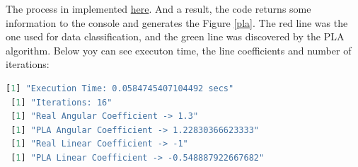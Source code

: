 \documentclass[12pt,letterpaper]{article}
\begin{document}
\begin{enumerate}[(a)]
		 The process in implemented \href{https://github.com/reneroliveira/Machine_Learning/blob/main/Exercises/PLA_algorithm.R}{here}. And a result, the code returns some information to the console and generates the Figure \ref{pla}. The red line was the one used for data classification, and the green line was discovered by the PLA algorithm. Below yoy can see executon time, the line coefficients and number of iterations:
		 
		 \begin{lstlisting}[language=R]
 [1] "Execution Time: 0.0584745407104492 secs"
 [1] "Iterations: 16"
 [1] "Real Angular Coefficient -> 1.3"
 [1] "PLA Angular Coefficient -> 1.22830366623333"
 [1] "Real Linear Coefficient -> -1"
 [1] "PLA Linear Coefficient -> -0.548887922667682"
		 \end{lstlisting}
		 
		 
	\end{enumerate}
	
\newpage



\end{document}

